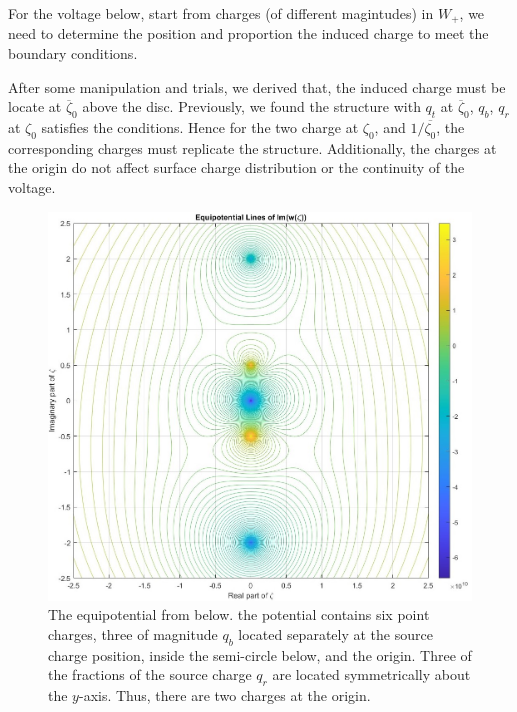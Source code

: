 For the voltage below, start from charges (of different magintudes) in $W_+$, we need to determine the position and proportion the induced charge to meet the boundary conditions.

After some manipulation and trials, we derived that, the induced charge must be locate at $\overline{\zeta}_0$ above the disc. Previously, we found the structure with $q_t$ at $\overline{\zeta}_0$,  $q_b$, $q_r$ at ${\zeta}_0$ satisfies the conditions. Hence for the two charge at $\zeta_0$, and $1/\overline{\zeta_0}$, the corresponding charges must replicate the structure. Additionally, the charges at the origin do not affect surface charge distribution or the continuity of the voltage. 

\begin{figure}[H]
    \centering
    \includegraphics[width=1.\linewidth]{Figs/disc phase, inside dieletric.jpg}
    \caption{The equipotential from below. the potential contains six point charges, three of magnitude $q_b$ located separately at the source charge position, inside the semi-circle below, and the origin. Three of the fractions of the source charge $q_r$ are located symmetrically about the $y$-axis. Thus, there are two charges at the origin.}
    \label{fig:w_down}
\end{figure}


